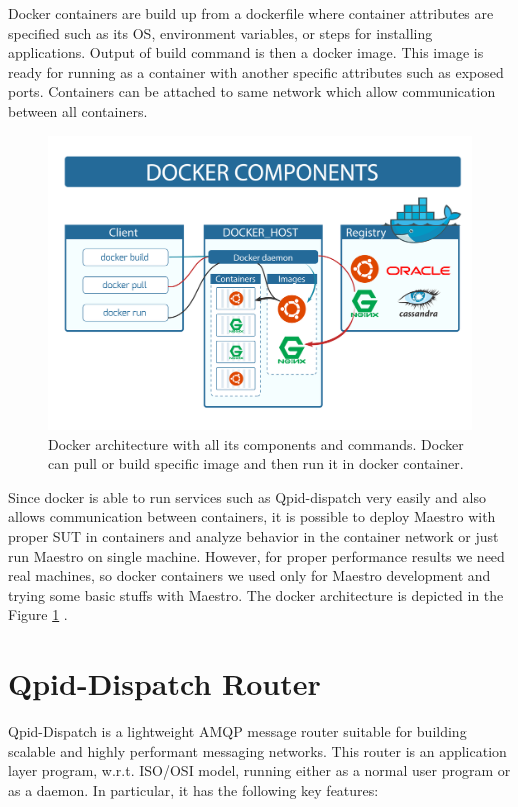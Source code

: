 Docker containers are build up from a dockerfile where container attributes are specified such as its OS, environment variables, or steps for installing applications. Output of build command is then a docker image. This image is ready for running as a container with another specific attributes such as exposed ports. Containers can be attached to same network which allow communication between all containers.

\begin{figure}[H]
  \centering
  \includegraphics[width=13cm]{obrazky-figures/docker.png}
  \caption{Docker architecture with all its components and commands. Docker can pull or build specific image and then run it in docker container.}
  \label{fig:docker_architecture}
\end{figure}


Since docker is able to run services such as Qpid-dispatch very easily and also allows communication between containers, it is possible to deploy Maestro with proper SUT in containers and analyze behavior in the container network or just run Maestro on single machine. However, for proper performance results we need real machines, so docker containers we used only for Maestro development and trying some basic stuffs with Maestro. The docker architecture is depicted in the Figure \ref{fig:docker_architecture} \cite{Docker-img}.

\section{Qpid-Dispatch Router}
Qpid-Dispatch is a lightweight AMQP message router suitable for building scalable and highly performant messaging networks. This router is an application layer program, w.r.t. ISO/OSI\footnotemark{} model, running either as a normal user program or as a daemon. In particular, it has the following key features:

